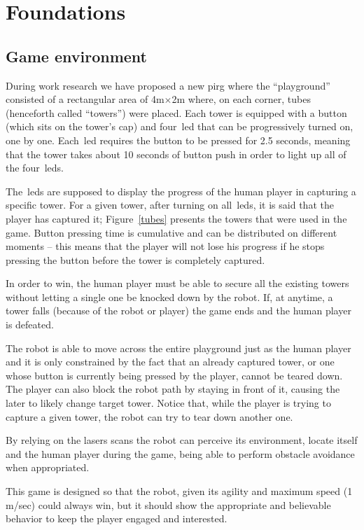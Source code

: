 \chapter{Foundations}\label{ch:foundation}

\section{Game environment}\label{sec:game_environment}
During work research we have proposed a new \gls{pirg} where the ``playground'' consisted of a rectangular area of 4m$\times$2m where, on each corner, tubes (henceforth called ``towers'') were placed. Each tower is equipped with a button (which sits on the tower's cap) and four~\gls{led} that can be progressively turned on, one by one.  Each~\gls{led} requires the button to be pressed for 2.5 seconds, meaning that the tower takes about 10 seconds of button push in order to light up all of the four~\gls{led}s.

The~\gls{led}s are supposed to display the progress of the human player in capturing a specific tower. For a given tower, after turning on all~\gls{led}s, it is said that the player has captured it; Figure~\ref{tubes} presents the towers that were used in the game.
Button pressing time is cumulative and can be distributed on different moments -- this means that the player will not lose his progress if he stops pressing the button before the tower is completely captured. 

In order to win, the human player must be able to secure all the existing towers without letting a single one be knocked down by the robot. If, at anytime, a tower falls (because of the robot or player) the game ends and the human player is defeated. 

The robot is able to move across the entire playground just as the human player and it is only constrained by the fact that an already captured tower, or one whose button is currently being pressed by the player, cannot be teared down. The player can also block the robot path by staying in front of it, causing the later to likely change target tower. Notice that, while the player is trying to capture a given tower, the robot can try to tear down another one.

By relying on the lasers scans the robot can perceive its environment, locate itself and the human player during the game, being able to perform obstacle avoidance when appropriated.

This game is designed so that the robot, given its agility and maximum speed (1 m/sec) could always win, but it should show the appropriate and believable behavior to keep the player engaged and interested.

